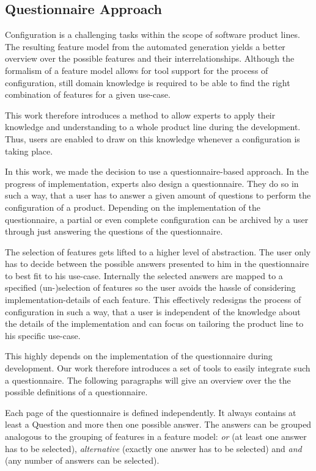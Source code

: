 \subsection{Questionnaire Approach}
Configuration is a challenging tasks within the scope of software product lines. The resulting feature model from the automated generation yields a better overview over the possible features and their interrelationships. Although the formalism of a feature model allows for tool support for the process of configuration, still domain knowledge is required to be able to find the right combination of features for a given use-case.

This work therefore introduces a method to allow experts to apply their knowledge and understanding to a whole product line during the development. Thus, users are enabled to draw on this knowledge whenever a configuration is taking place.

In this work, we made the decision to use a questionnaire-based approach. In the progress of implementation, experts also design a questionnaire. They do so in such a way, that a user has to answer a given amount of questions to perform the configuration of a product. Depending on the implementation of the questionnaire, a partial or even complete configuration can be archived by a user through just answering the questions of the questionnaire.

The selection of features gets lifted to a higher level of abstraction. The user only has to decide between the possible answers presented to him in the questionnaire to best fit to his use-case. Internally the selected answers are mapped to a specified (un-)selection of features so the user avoids the hassle of considering implementation-details of each feature. This effectively redesigns the process of configuration in such a way, that a user is independent of the knowledge about the details of the implementation and can focus on tailoring the product line to his specific use-case.

This highly depends on the implementation of the questionnaire during development. Our work therefore introduces a set of tools to easily integrate such a questionnaire. The following paragraphs will give an overview over the the possible definitions of a questionnaire.

Each page of the questionnaire is defined independently. It always contains at least a Question and more then one possible answer. The answers can be grouped analogous to the grouping of features in a feature model: \textit{or} (at least one answer has to be selected), \textit{alternative} (exactly one answer has to be selected) and \textit{and} (any number of answers can be selected).

